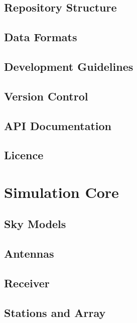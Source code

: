 	\chapter{Repository Structure}
	

	\chapter{Data Formats}
	

	\chapter{Development Guidelines}
	

	\chapter{Version Control}
	

	\chapter{API Documentation}
	

	\chapter{Licence}
	

\part{Simulation Core}

	\chapter{Sky Models}
	

	\chapter{Antennas}
	

	\chapter{Receiver}
	

	\chapter{Stations and Array}
	

